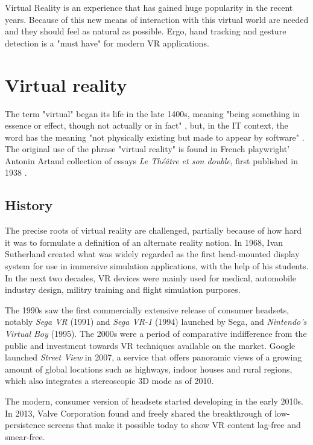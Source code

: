 \documentclass[12pt,a4paper,twoside]{report}
\begin{document}
Virtual Reality is an experience that has gained huge popularity in the recent years. Because of this new means of interaction with this virtual world are needed and they should feel as natural as possible. Ergo, hand tracking and gesture detection is a "must have" for modern VR applications.

\section{Virtual reality}
The term "virtual" began its life in the late 1400s, meaning "being something in essence or effect, though not actually or in fact" \cite{Virtual}, but, in the IT context, the word has the meaning "not physically existing but made to appear by software" \cite{Virtual}. The original use of the phrase "virtual reality" is found in French playwright' Antonin Artaud collection of essays \textit{Le Théâtre et son double}, first published in 1938 \cite{TheatreAndItsDouble}.

\subsection{History}
The precise roots of virtual reality are challenged, partially because of how hard it was to formulate a definition of an alternate reality notion. In 1968, Ivan Sutherland created what was widely regarded as the first head-mounted display system for use in immersive simulation applications, with the help of his students. In the next two decades, VR devices were mainly used for medical, automobile industry design, militry training and flight simulation purposes.

The 1990s saw the first commercially extensive release of consumer headsets, notably \textit{Sega VR} (1991) and \textit{Sega VR-1} (1994) launched by Sega, and \textit{Nintendo's Virtual Boy} (1995). The 2000s were a period of comparative indifference from the public and investment towards VR techniques available on the market. Google launched \textit{Street View} in 2007, a service that offers panoramic views of a growing amount of global locations such as highways, indoor houses and rural regions, which also integrates a stereoscopic 3D mode as of 2010.

The modern, consumer version of headsets started developing in the early 2010s. In 2013, Valve Corporation found and freely shared the breakthrough of low-persistence screens that make it possible today to show VR content lag-free and smear-free. 
\end{document}
